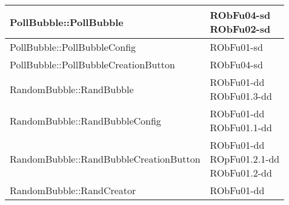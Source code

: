 \begin{center}
\begin{longtable}{|
*{1}{>{\centering\arraybackslash}m{7.5cm}|}
*{1}{>{\centering\arraybackslash}m{2.5cm}|}}
PollBubble::PollBubble & \makecell{RObFu04-sd
\\RObFu02-sd
\\}\\\hline
PollBubble::PollBubbleConfig & \makecell{RObFu01-sd
\\}\\\hline
PollBubble::PollBubbleCreationButton & \makecell{RObFu04-sd
\\}\\\hline
RandomBubble::RandBubble & \makecell{RObFu01-dd
\\RObFu01.3-dd
\\}\\\hline
RandomBubble::RandBubbleConfig & \makecell{RObFu01-dd
\\RObFu01.1-dd
\\}\\\hline
RandomBubble::RandBubbleCreationButton & \makecell{RObFu01-dd
\\ROpFu01.2.1-dd
\\RObFu01.2-dd
\\}\\\hline
RandomBubble::RandCreator & \makecell{RObFu01-dd
\\}\\\hline
\end{longtable}
\end{center}
